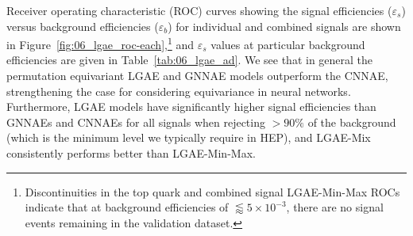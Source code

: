 Receiver operating characteristic (ROC) curves showing the signal efficiencies ($\varepsilon_s$) versus background efficiencies ($\varepsilon_b$) for individual and combined signals are shown in Figure~\ref{fig:06_lgae_roc-each},\footnote{Discontinuities in the top quark and combined signal LGAE-Min-Max ROCs indicate that at background efficiencies of $\lessapprox 5\times10^{-3}$, there are no signal events remaining in the validation dataset.} and $\varepsilon_s$ values at particular background efficiencies are given in Table~\ref{tab:06_lgae_ad}.
We see that in general the permutation equivariant LGAE and GNNAE models outperform the CNNAE, strengthening the case for considering equivariance in neural networks.
Furthermore, LGAE models have significantly higher signal efficiencies than GNNAEs and CNNAEs for all signals when rejecting $>90\%$ of the background (which is the minimum level we typically require in HEP), and LGAE-Mix consistently performs better than LGAE-Min-Max.

